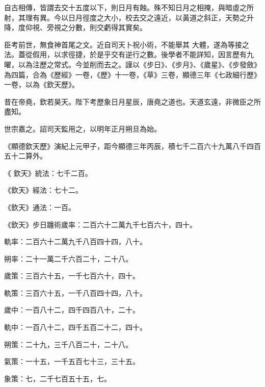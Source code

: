 \begin{pinyinscope}
 自古相傳，皆謂去交十五度以下，則日月有蝕。殊不知日月之相掩，與暗虛之所射，其理有異。今以日月徑度之大小，校去交之遠近，以黃道之斜正，天勢之升降，度仰視、旁視之分數，則交虧得其實矣。



 臣考前世，無食神首尾之文。近自司天卜祝小術，不能舉其
 大體，遂為等接之法。蓋從假用，以求徑捷，於是乎交有逆行之數。後學者不能詳知，因言歷有九曜，以為注歷之常式。今並削而去之。謹以《步日》、《步月》、《歲星》、《步發斂》為四篇，合為《歷經》一卷，《歷》十一卷，《草》三卷，顯德三年《七政細行歷》一卷，以為《欽天歷》。



 昔在帝堯，欽若昊天。陛下考歷象日月星辰，唐堯之道也。天道玄遠，非微臣之所盡知。



 世宗嘉之。詔司天監用之，以明年正月朔旦為始。



 《顯德欽天歷》演紀上元甲子，距今顯德三年丙辰，積七千二百六十九萬八千四百五十二算外。



 《
 欽天》統法：七千二百。



 《欽天》經法：七十二。



 《欽天》通法：一百。



 《欽天》步日躔術歲率：二百六十二萬九千七百六十，四十。



 軌率：二百六十二萬九千八百四十四，八十。



 朔率：二十一萬二千六百二十，二十八。



 歲策：三百六十五，一千七百六十，四十。



 軌策：三百六十五，一千八百四十四，八十。



 歲中：一百八十二，四千四百八十，二十。



 軌中：一百八十二，四千五百二十二，四十。



 朔策：二十九，三千八百二十，二十八。



 氣策：一十五，一千五百七十三，三十五。



 象策：七，二千七百五十五，七。




\end{pinyinscope}
